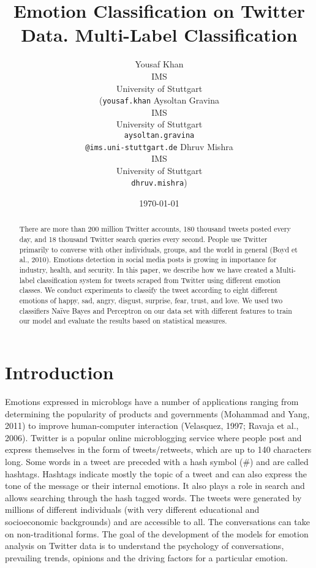 \documentclass[11pt]{article}
\title{Emotion Classification on Twitter Data.
  Multi-Label Classification
  }
\author{
  Yousaf Khan\\
  IMS\\
  University of Stuttgart\\
  (\texttt{yousaf.khan}
  \And
  Aysoltan Gravina\\
  IMS\\
  University of Stuttgart\\
    \texttt{aysoltan.gravina}\\
    \texttt{@ims.uni-stuttgart.de}
    \And
  Dhruv Mishra\\
  IMS\\
  University of Stuttgart\\
    \texttt{dhruv.mishra})
  }
\date{\today}
\begin{document}
  \maketitle
  \begin{abstract}
  There are more than 200 million Twitter accounts, 180 thousand tweets posted every day, and 18 thousand Twitter search queries every second. People use Twitter primarily to converse with other individuals, groups, and the world in general (Boyd et al., 2010). Emotions detection in social media posts is growing in importance for industry, health, and security.
  In this paper, we describe how we have created a Multi-label classification system for tweets scraped from Twitter using different emotion classes. We conduct experiments to classify the tweet according to eight different emotions of happy, sad, angry, disgust, surprise, fear, trust, and love. We used two classifiers Naïve Bayes and Perceptron on our data set with different features to train our model and evaluate the results based on statistical measures.
  
  
  \end{abstract}
  
  
  
  \section{Introduction}
  
  Emotions expressed in microblogs have a number of applications ranging from determining the popularity of products and governments (Mohammad and Yang, 2011) to improve human-computer interaction (Velasquez, 1997; Ravaja et al., 2006).
    Twitter is a popular online microblogging service where people post and express themselves in the form of tweets/retweets, which are up to 140 characters long. Some words in a tweet are preceded with a hash symbol (\#) and are called hashtags. Hashtags indicate mostly the topic of a tweet and can also express the tone of the message or their internal emotions. It also plays a role in search and allows searching through the hash tagged words.
    The tweets were generated by millions of different individuals (with very different educational and socioeconomic backgrounds) and are accessible to all. The conversations can take on non-traditional forms. The goal of the development of the models for emotion analysis on Twitter data is to understand the psychology of conversations, prevailing trends, opinions and the driving factors for a particular emotion.
  
\end{document}
